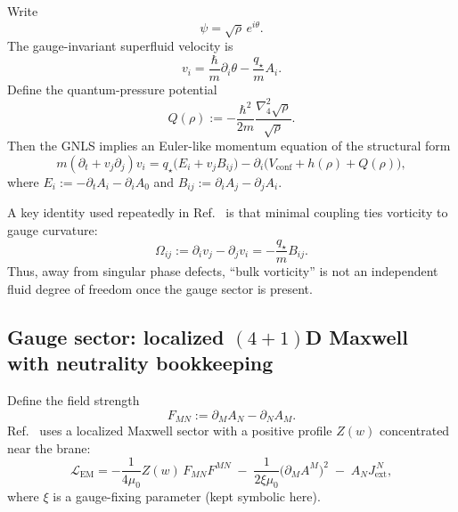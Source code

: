 \documentclass[11pt]{article}
\newcommand{\qstar}{q_\star}
\begin{document}
Write
\begin{equation}
\psi=\sqrt{\rho}\,e^{i\theta}.
\end{equation}
The gauge-invariant superfluid velocity is
\begin{equation}
\boxed{
v_i = \frac{\hbar}{m}\partial_i\theta - \frac{\qstar}{m}A_i.
}
\label{eq:recap_velocity}
\end{equation}
Define the quantum-pressure potential
\begin{equation}
Q(\rho) := -\frac{\hbar^2}{2m}\frac{\nabla_4^2\sqrt{\rho}}{\sqrt{\rho}}.
\label{eq:recap_quantum_pressure}
\end{equation}
Then the GNLS implies an Euler-like momentum equation of the structural form
\begin{equation}
\boxed{
m(\partial_t+v_j\partial_j)v_i
=
\qstar\big(E_i+v_j B_{ij}\big)
-\partial_i\!\big(V_{\mathrm{conf}}+h(\rho)+Q(\rho)\big),
}
\label{eq:recap_euler_like}
\end{equation}
where $E_i:=-\partial_tA_i-\partial_iA_0$ and $B_{ij}:=\partial_iA_j-\partial_jA_i$.

A key identity used repeatedly in Ref.~\cite{norris2026_4d_model} is that minimal coupling ties vorticity to gauge curvature:
\begin{equation}
\boxed{
\Omega_{ij}:=\partial_i v_j-\partial_j v_i
=
-\frac{\qstar}{m}B_{ij}.
}
\label{eq:recap_vorticity_identity}
\end{equation}
Thus, away from singular phase defects, ``bulk vorticity'' is not an independent fluid degree of freedom once the gauge sector is present.

\subsection{Gauge sector: localized $(4+1)$D Maxwell with neutrality bookkeeping}
\label{sec:recap_em}

Define the field strength
\begin{equation}
F_{MN}:=\partial_M A_N-\partial_N A_M.
\end{equation}
Ref.~\cite{norris2026_4d_model} uses a localized Maxwell sector with a positive profile $Z(w)$ concentrated near the brane:
\begin{equation}
\mathcal{L}_{\mathrm{EM}}
=
-\frac{1}{4\mu_0}Z(w)\,F_{MN}F^{MN}
\;-\;\frac{1}{2\xi\mu_0}\big(\partial_M A^M\big)^2
\;-\;A_N J_{\mathrm{ext}}^{\,N},
\label{eq:recap_em_lagrangian}
\end{equation}
where $\xi$ is a gauge-fixing parameter (kept symbolic here).
\end{document}
